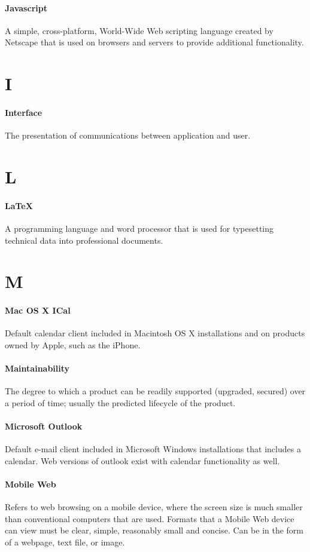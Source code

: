 \documentclass[letterpaper,12pt]{report}
\begin{document}
\paragraph{Javascript} A simple, cross-platform, World-Wide Web scripting language created by Netscape that is used on browsers and servers to provide additional functionality.
\section*{I}
\paragraph{Interface} The presentation of communications between application and user.
\section*{L}
\paragraph{LaTeX} A programming language and word processor that is used for typesetting technical data into professional documents.
\section*{M}
\paragraph{Mac OS X ICal} Default calendar client included in Macintosh OS X installations and on products owned by Apple, such as the iPhone.
\paragraph{Maintainability} The degree to which a product can be readily supported (upgraded, secured) over a period of time; usually the predicted lifecycle of the product.
\paragraph{Microsoft Outlook} Default e-mail client included in Microsoft Windows installations that includes a calendar. Web versions of outlook exist with calendar functionality as well.
\paragraph{Mobile Web} Refers to web browsing on a mobile device, where the screen size is much smaller than conventional computers that are used. Formats that a Mobile Web device can view must be clear, simple, reasonably small and concise. Can be in the form of a webpage, text file, or image.
\end{document}
